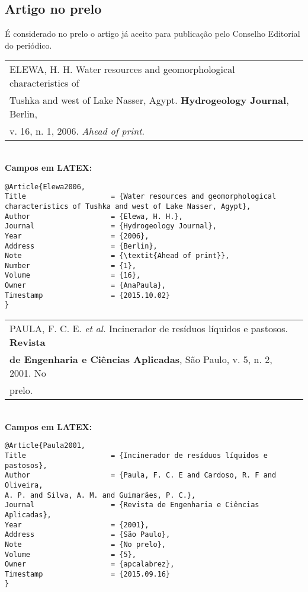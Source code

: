 \subsection{Artigo no prelo}

É considerado no prelo o artigo já aceito para publicação pelo Conselho
Editorial do periódico.

\begin{tabular}{|l|c|} \hline
	ELEWA, H. H. Water resources and geomorphological characteristics of
	\\Tushka and west of Lake Nasser, Agypt. \textbf{Hydrogeology Journal}, Berlin,
	\\v. 16, n. 1, 2006. \textit{Ahead of print}. \\\hline
\end{tabular} \\

\textbf{Campos em LATEX:} 

\begin{verbatim}
@Article{Elewa2006,
Title                    = {Water resources and geomorphological 
characteristics of Tushka and west of Lake Nasser, Agypt},
Author                   = {Elewa, H. H.},
Journal                  = {Hydrogeology Journal},
Year                     = {2006},
Address                  = {Berlin},
Note                     = {\textit{Ahead of print}},
Number                   = {1},
Volume                   = {16},
Owner                    = {AnaPaula},
Timestamp                = {2015.10.02}
}
\end{verbatim}

\begin{tabular}{|l|c|} \hline
	PAULA, F. C. E. \textit{et al.} Incinerador de resíduos líquidos e pastosos.
	\textbf{Revista } \\ \textbf{de Engenharia e Ciências Aplicadas}, São Paulo, v. 5, n. 2,
	2001. No \\prelo. \\\hline
\end{tabular} \\

\textbf{Campos em LATEX:} 

\begin{verbatim}
@Article{Paula2001,
Title                    = {Incinerador de resíduos líquidos e pastosos},
Author                   = {Paula, F. C. E and Cardoso, R. F and Oliveira, 
A. P. and Silva, A. M. and Guimarães, P. C.},
Journal                  = {Revista de Engenharia e Ciências Aplicadas},
Year                     = {2001},
Address                  = {São Paulo},
Note                     = {No prelo},
Volume                   = {5},
Owner                    = {apcalabrez},
Timestamp                = {2015.09.16}
}
\end{verbatim}

